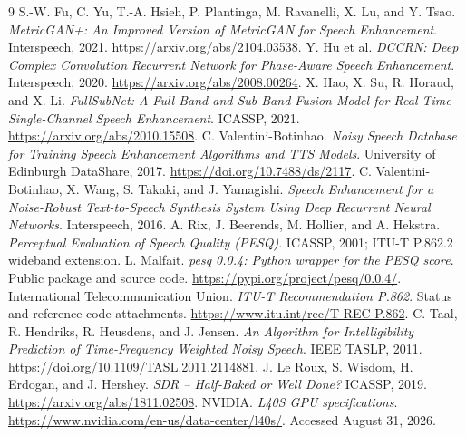 \documentclass[11pt,letterpaper]{article}
\begin{document}
\footnotesize
\begin{thebibliography}{9}
 S.-W. Fu, C. Yu, T.-A. Hsieh, P. Plantinga, M. Ravanelli, X. Lu, and Y. Tsao. \emph{MetricGAN+: An Improved Version of MetricGAN for Speech Enhancement}. Interspeech, 2021. \url{https://arxiv.org/abs/2104.03538}.
 Y. Hu et al. \emph{DCCRN: Deep Complex Convolution Recurrent Network for Phase-Aware Speech Enhancement}. Interspeech, 2020. \url{https://arxiv.org/abs/2008.00264}.
 X. Hao, X. Su, R. Horaud, and X. Li. \emph{FullSubNet: A Full-Band and Sub-Band Fusion Model for Real-Time Single-Channel Speech Enhancement}. ICASSP, 2021. \url{https://arxiv.org/abs/2010.15508}.
 C. Valentini-Botinhao. \emph{Noisy Speech Database for Training Speech Enhancement Algorithms and TTS Models}. University of Edinburgh DataShare, 2017. \url{https://doi.org/10.7488/ds/2117}.
 C. Valentini-Botinhao, X. Wang, S. Takaki, and J. Yamagishi. \emph{Speech Enhancement for a Noise-Robust Text-to-Speech Synthesis System Using Deep Recurrent Neural Networks}. Interspeech, 2016.
 A. Rix, J. Beerends, M. Hollier, and A. Hekstra. \emph{Perceptual Evaluation of Speech Quality (PESQ)}. ICASSP, 2001; ITU-T P.862.2 wideband extension.
 L. Malfait. \emph{pesq 0.0.4: Python wrapper for the PESQ score}. Public package and source code. \url{https://pypi.org/project/pesq/0.0.4/}.
 International Telecommunication Union. \emph{ITU-T Recommendation P.862}. Status and reference-code attachments. \url{https://www.itu.int/rec/T-REC-P.862}.
 C. Taal, R. Hendriks, R. Heusdens, and J. Jensen. \emph{An Algorithm for Intelligibility Prediction of Time-Frequency Weighted Noisy Speech}. IEEE TASLP, 2011. \url{https://doi.org/10.1109/TASL.2011.2114881}.
 J. Le Roux, S. Wisdom, H. Erdogan, and J. Hershey. \emph{SDR -- Half-Baked or Well Done?} ICASSP, 2019. \url{https://arxiv.org/abs/1811.02508}.
 NVIDIA. \emph{L40S GPU specifications}. \url{https://www.nvidia.com/en-us/data-center/l40s/}. Accessed August 31, 2026.
\end{thebibliography}
\end{document}
